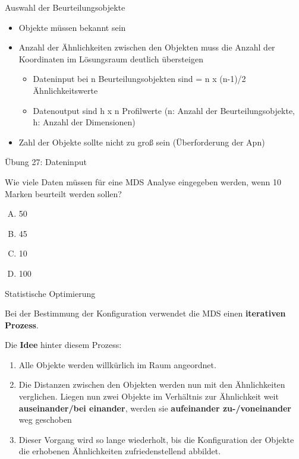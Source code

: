 \documentclass[12pt,ngerman,a4paper,ignorenonframetext,]{beamer}
\providecommand{\tightlist}{%
  \setlength{\itemsep}{0pt}\setlength{\parskip}{0pt}}
\begin{document}
\begin{frame}{Auswahl der Beurteilungsobjekte}
\protect\hypertarget{auswahl-der-beurteilungsobjekte}{}

\begin{itemize}
\tightlist
\item
  Objekte müssen bekannt sein
\item
  Anzahl der Ähnlichkeiten zwischen den Objekten muss die Anzahl der
  Koordinaten im Lösungsraum deutlich übersteigen

  \begin{itemize}
  \tightlist
  \item
    Dateninput bei n Beurteilungsobjekten sind = n x (n-1)/2
    Ähnlichkeitswerte
  \item
    Datenoutput sind h x n Profilwerte (n: Anzahl der
    Beurteilungsobjekte, h: Anzahl der Dimensionen)
  \end{itemize}
\item
  Zahl der Objekte sollte nicht zu groß sein (Überforderung der Apn)
\end{itemize}

\end{frame}

\begin{frame}{Übung 27: Dateninput}
\protect\hypertarget{ubung-27-dateninput}{}

Wie viele Daten müssen für eine MDS Analyse eingegeben werden, wenn 10
Marken beurteilt werden sollen?

\begin{enumerate}
[A.]
\tightlist
\item
  50
\item
  45
\item
  10
\item
  100
\end{enumerate}


\end{frame}

\begin{frame}{Statistische Optimierung}
\protect\hypertarget{statistische-optimierung}{}

Bei der Bestimmung der Konfiguration verwendet die MDS einen
\textbf{iterativen Prozess}.

Die \textbf{Idee} hinter diesem Prozess:

\begin{enumerate}
\tightlist
\item
  Alle Objekte werden willkürlich im Raum angeordnet.
\item
  Die Distanzen zwischen den Objekten werden nun mit den Ähnlichkeiten
  verglichen. Liegen nun zwei Objekte im Verhältnis zur Ähnlichkeit weit
  \textbf{auseinander/bei einander}, werden sie \textbf{aufeinander
  zu-/voneinander} weg geschoben
\item
  Dieser Vorgang wird so lange wiederholt, bis die Konfiguration der
  Objekte die erhobenen Ähnlichkeiten zufriedenstellend abbildet.
\end{enumerate}

\end{frame}
\end{document}
